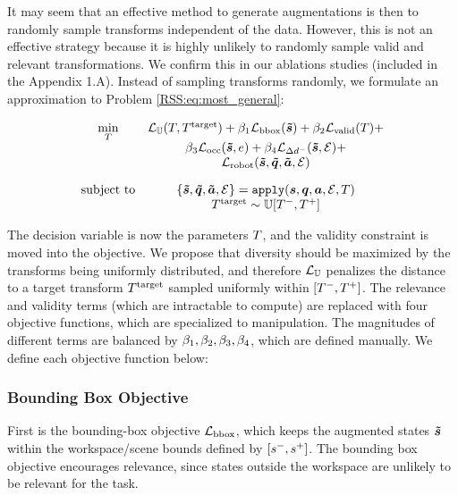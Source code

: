 It may seem that an effective method to generate augmentations is then to randomly sample transforms independent of the data. However, this is not an effective strategy because it is highly unlikely to randomly sample valid and relevant transformations. We confirm this in our ablations studies (included in the Appendix 1.A). Instead of sampling transforms randomly, we formulate an approximation to Problem \ref{RSS:eq:most_general}:

\begin{equation}
    \label{RSS:eq:method}
    \begin{array}{cc}
        \underset{T}{\mathrm{min}} & 
        \mathcal{L}_{\mathbb{U}}(T,T^\text{target}) +
        \beta_1\mathcal{L}_\text{bbox}(\bm{\Tilde{s}}) + \beta_2\mathcal{L}_\text{valid}(T) + \\
        & \beta_3\mathcal{L}_\text{occ}(\bm{\Tilde{s}},e) + \beta_4\mathcal{L}_{\Delta{d^-}}(\bm{\Tilde{s}},\mathcal{E}) + \\
        & \mathcal{L}_\text{robot}(\bm{\Tilde{s}},\bm{\Tilde{q}},\bm{\Tilde{a}},\mathcal{E}) \\[1em]
        \text{subject to} & \{\bm{\Tilde{s}},\bm{\Tilde{q}},\bm{\Tilde{a}},\mathcal{E}\} = \texttt{apply}(\bm{s},\bm{q},\bm{a},\mathcal{E},T) \\
        & T^\text{target}\sim\mathbb{U}[T^-,T^+] \\
    \end{array}
\end{equation}

The decision variable is now the parameters $T$, and the validity constraint is moved into the objective. We propose that diversity should be maximized by the transforms being uniformly distributed, and therefore $\mathcal{L}_{\mathbb{U}}$ penalizes the distance to a target transform $T^\text{target}$ sampled uniformly within $[T^-,T^+]$. The relevance and validity terms (which are intractable to compute) are replaced with four objective functions, which are specialized to manipulation. The magnitudes of different terms are balanced by ${\beta_1,\beta_2,\beta_3,\beta_4}$, which are defined manually. We define each objective function below:

\subsubsection{Bounding Box Objective}
First is the bounding-box objective $\mathcal{L}_\text{bbox}$, which keeps the augmented states $\bm{\Tilde{s}}$ within the workspace/scene bounds defined by $[s^-,s^+]$. The bounding box objective encourages relevance, since states outside the workspace are unlikely to be relevant for the task.

